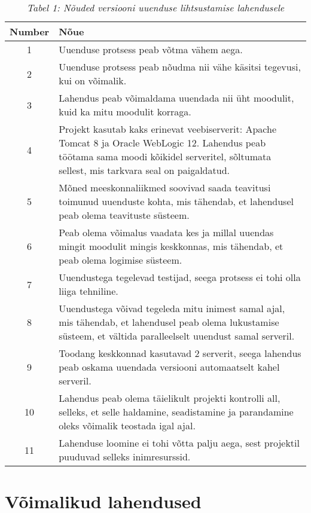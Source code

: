 \documentclass[12pt]{report}
\begin{document}
  \begin{table}
  \begin{tabular}{|c|p{11cm}|}
    \hline
    \textbf{Number} & \textbf{Nõue}\\
    \hline
    1 & Uuenduse protsess peab võtma vähem aega.\\
    \hline
    2 & Uuenduse protsess peab nõudma nii vähe käsitsi tegevusi, kui on võimalik.\\
    \hline
    3 & Lahendus peab võimaldama uuendada nii üht moodulit, kuid ka mitu moodulit korraga.\\
    \hline
    4 & Projekt kasutab kaks erinevat veebiserverit: Apache Tomcat 8 ja Oracle WebLogic 12. Lahendus peab töötama sama moodi kõikidel serveritel, sõltumata sellest, mis tarkvara seal on paigaldatud.\\
    \hline
    5 & Mõned meeskonnaliikmed soovivad saada teavitusi toimunud uuenduste kohta, mis tähendab, et lahendusel peab olema teavituste süsteem.\\
    \hline
    6 & Peab olema võimalus vaadata kes ja millal uuendas mingit moodulit mingis keskkonnas, mis tähendab, et peab olema logimise süsteem.\\
    \hline
    7 & Uuendustega tegelevad testijad, seega protsess ei tohi olla liiga tehniline.\\
    \hline
    8 & Uuendustega võivad tegeleda mitu inimest samal ajal, mis tähendab, et lahendusel peab olema lukustamise süsteem, et vältida paralleelselt uuendust samal serveril.\\
    \hline
    9 & Toodang keskkonnad kasutavad 2 serverit, seega lahendus peab oskama uuendada versiooni automaatselt kahel serveril.\\
    \hline
    10 & Lahendus peab olema täielikult projekti kontrolli all, selleks, et selle haldamine, seadistamine ja parandamine oleks võimalik teostada igal ajal.\\
    \hline
    11 & Lahenduse loomine ei tohi võtta palju aega, sest projektil puuduvad selleks inimresurssid.\\
    \hline
  \end{tabular}
  \caption*{\textit{Tabel 1: Nõuded versiooni uuenduse lihtsustamise lahendusele}}
  \end{table}
  
  \newpage
  
  \section{Võimalikud lahendused}
  
\end{document}
